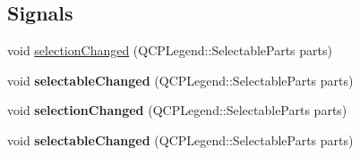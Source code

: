 \subsection*{Signals}
\begin{DoxyCompactItemize}
\item 
void \hyperlink{class_q_c_p_legend_a82c88464edac07a9eefaf3906268df3b}{selection\+Changed} (Q\+C\+P\+Legend\+::\+Selectable\+Parts parts)
\item 
\mbox{\label{class_q_c_p_legend_a8a77300fd0976d6bdd8000f4e8d114b8}} 
void {\bfseries selectable\+Changed} (Q\+C\+P\+Legend\+::\+Selectable\+Parts parts)
\item 
\mbox{\label{class_q_c_p_legend_a82c88464edac07a9eefaf3906268df3b}} 
void {\bfseries selection\+Changed} (Q\+C\+P\+Legend\+::\+Selectable\+Parts parts)
\item 
\mbox{\label{class_q_c_p_legend_a8a77300fd0976d6bdd8000f4e8d114b8}} 
void {\bfseries selectable\+Changed} (Q\+C\+P\+Legend\+::\+Selectable\+Parts parts)
\end{DoxyCompactItemize}
